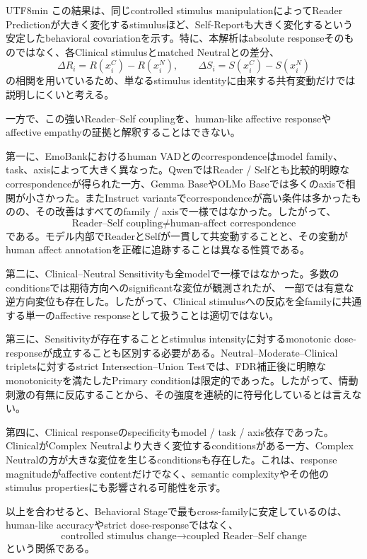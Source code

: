 \documentclass{article} %
\begin{document}
\begin{CJK*}{UTF8}{min}
この結果は、同じcontrolled stimulus manipulationによってReader Predictionが大きく変化するstimulusほど、Self-Reportも大きく変化するという安定したbehavioral covariationを示す。特に、本解析はabsolute responseそのものではなく、各Clinical stimulusとmatched Neutralとの差分、
\[
\Delta R_i
=
R(x_i^C)-R(x_i^N),
\qquad
\Delta S_i
=
S(x_i^C)-S(x_i^N)
\]
の相関を用いているため、単なるstimulus identityに由来する共有変動だけでは説明しにくいと考える。

一方で、この強いReader--Self couplingを、human-like affective responseやaffective empathyの証拠と解釈することはできない。

第一に、EmoBankにおけるhuman VADとのcorrespondenceはmodel family、task、axisによって大きく異なった。QwenではReader / Selfとも比較的明瞭なcorrespondenceが得られた一方、Gemma BaseやOLMo Baseでは多くのaxisで相関が小さかった。またInstruct variantsでcorrespondenceが高い条件は多かったものの、その改善はすべてのfamily / axisで一様ではなかった。したがって、
\[
\text{Reader--Self coupling}
\neq
\text{human-affect correspondence}
\]
である。モデル内部でReaderとSelfが一貫して共変動することと、その変動がhuman affect annotationを正確に追跡することは異なる性質である。

第二に、Clinical--Neutral Sensitivityも全modelで一様ではなかった。多数のconditionsでは期待方向へのsignificantな変位が観測されたが、
一部では有意な逆方向変位も存在した。したがって、Clinical stimulusへの反応を全familyに共通する単一のaffective responseとして扱うことは適切ではない。

第三に、Sensitivityが存在することとstimulus intensityに対するmonotonic dose-responseが成立することも区別する必要がある。Neutral--Moderate--Clinical tripletsに対するstrict Intersection--Union Testでは、FDR補正後に明瞭なmonotonicityを満たしたPrimary conditionは限定的であった。したがって、情動刺激の有無に反応することから、その強度を連続的に符号化しているとは言えない。

第四に、Clinical responseのspecificityもmodel / task / axis依存であった。ClinicalがComplex Neutralより大きく変位するconditionsがある一方、Complex Neutralの方が大きな変位を生じるconditionsも存在した。これは、response magnitudeがaffective contentだけでなく、semantic complexityやその他のstimulus propertiesにも影響される可能性を示す。

以上を合わせると、Behavioral Stageで最もcross-familyに安定しているのは、human-like accuracyやstrict dose-responseではなく、
\[
\text{controlled stimulus change}
\rightarrow
\text{coupled Reader--Self change}
\]
という関係である。


\end{CJK*}
\end{document}
